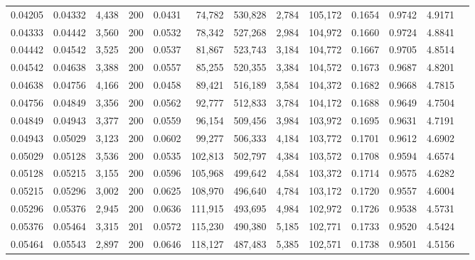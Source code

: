 \begin{tabular}{rrrrrrrrrrrrr}
0.04205 & 0.04332 & 4,438 & 200 &                                     0.0431 &  74,782 & 530,828 &   2,784 & 105,172 & 0.1654 & 0.9742 & 4.9171 \\
0.04333 & 0.04442 & 3,560 & 200 &                                     0.0532 &  78,342 & 527,268 &   2,984 & 104,972 & 0.1660 & 0.9724 & 4.8841 \\
0.04442 & 0.04542 & 3,525 & 200 &                                     0.0537 &  81,867 & 523,743 &   3,184 & 104,772 & 0.1667 & 0.9705 & 4.8514 \\
0.04542 & 0.04638 & 3,388 & 200 &                                     0.0557 &  85,255 & 520,355 &   3,384 & 104,572 & 0.1673 & 0.9687 & 4.8201 \\
0.04638 & 0.04756 & 4,166 & 200 &                                     0.0458 &  89,421 & 516,189 &   3,584 & 104,372 & 0.1682 & 0.9668 & 4.7815 \\
0.04756 & 0.04849 & 3,356 & 200 &                                     0.0562 &  92,777 & 512,833 &   3,784 & 104,172 & 0.1688 & 0.9649 & 4.7504 \\
0.04849 & 0.04943 & 3,377 & 200 &                                     0.0559 &  96,154 & 509,456 &   3,984 & 103,972 & 0.1695 & 0.9631 & 4.7191 \\
0.04943 & 0.05029 & 3,123 & 200 &                                     0.0602 &  99,277 & 506,333 &   4,184 & 103,772 & 0.1701 & 0.9612 & 4.6902 \\
0.05029 & 0.05128 & 3,536 & 200 &                                     0.0535 & 102,813 & 502,797 &   4,384 & 103,572 & 0.1708 & 0.9594 & 4.6574 \\
0.05128 & 0.05215 & 3,155 & 200 &                                     0.0596 & 105,968 & 499,642 &   4,584 & 103,372 & 0.1714 & 0.9575 & 4.6282 \\
0.05215 & 0.05296 & 3,002 & 200 &                                     0.0625 & 108,970 & 496,640 &   4,784 & 103,172 & 0.1720 & 0.9557 & 4.6004 \\
0.05296 & 0.05376 & 2,945 & 200 &                                     0.0636 & 111,915 & 493,695 &   4,984 & 102,972 & 0.1726 & 0.9538 & 4.5731 \\
0.05376 & 0.05464 & 3,315 & 201 &                                     0.0572 & 115,230 & 490,380 &   5,185 & 102,771 & 0.1733 & 0.9520 & 4.5424 \\
0.05464 & 0.05543 & 2,897 & 200 &                                     0.0646 & 118,127 & 487,483 &   5,385 & 102,571 & 0.1738 & 0.9501 & 4.5156 \\

\end{tabular}
